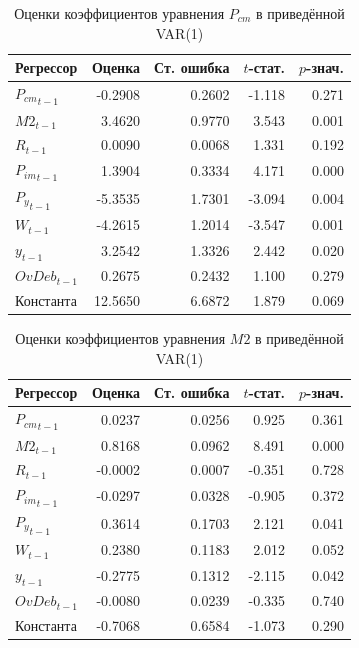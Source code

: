 \begin{table}[H]
\centering
\small

\begin{tabular}{l|r|r|r|r}
\hline
Регрессор & Оценка & Ст. ошибка & $t$-стат. & $p$-знач.\\
\hline
${P_{cm}}_{t-1}$ & -0.2908 & 0.2602 & -1.118 & 0.271\\
\hline
${M2}_{t-1}$ & 3.4620 & 0.9770 & 3.543 & 0.001\\
\hline
${R}_{t-1}$ & 0.0090 & 0.0068 & 1.331 & 0.192\\
\hline
${P_{im}}_{t-1}$ & 1.3904 & 0.3334 & 4.171 & 0.000\\
\hline
${P_y}_{t-1}$ & -5.3535 & 1.7301 & -3.094 & 0.004\\
\hline
${W}_{t-1}$ & -4.2615 & 1.2014 & -3.547 & 0.001\\
\hline
${y}_{t-1}$ & 3.2542 & 1.3326 & 2.442 & 0.020\\
\hline
${OvDeb}_{t-1}$ & 0.2675 & 0.2432 & 1.100 & 0.279\\
\hline
Константа & 12.5650 & 6.6872 & 1.879 & 0.069\\
\hline
\end{tabular}
\caption{Оценки коэффициентов уравнения $P_{cm}$ в приведённой VAR(1)}
\label{tab:var_coef_p_cm}
\end{table}

\begin{table}[H]
\centering
\small

\begin{tabular}{l|r|r|r|r}
\hline
Регрессор & Оценка & Ст. ошибка & $t$-стат. & $p$-знач.\\
\hline
${P_{cm}}_{t-1}$ & 0.0237 & 0.0256 & 0.925 & 0.361\\
\hline
${M2}_{t-1}$ & 0.8168 & 0.0962 & 8.491 & 0.000\\
\hline
${R}_{t-1}$ & -0.0002 & 0.0007 & -0.351 & 0.728\\
\hline
${P_{im}}_{t-1}$ & -0.0297 & 0.0328 & -0.905 & 0.372\\
\hline
${P_y}_{t-1}$ & 0.3614 & 0.1703 & 2.121 & 0.041\\
\hline
${W}_{t-1}$ & 0.2380 & 0.1183 & 2.012 & 0.052\\
\hline
${y}_{t-1}$ & -0.2775 & 0.1312 & -2.115 & 0.042\\
\hline
${OvDeb}_{t-1}$ & -0.0080 & 0.0239 & -0.335 & 0.740\\
\hline
Константа & -0.7068 & 0.6584 & -1.073 & 0.290\\
\hline
\end{tabular}
\caption{Оценки коэффициентов уравнения $M2$ в приведённой VAR(1)}
\label{tab:var_coef_m2}
\end{table}

